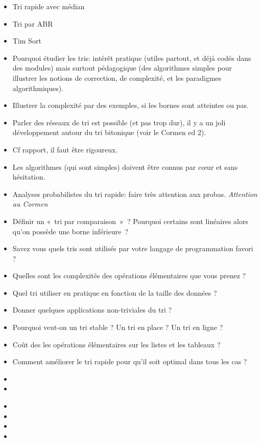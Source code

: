 \documentclass{agregfiche}
\begin{document}
\begin{itemize}
    \item Tri rapide avec médian
    \item Tri par ABR
    \item Tim Sort
    \item Pourquoi étudier les tris: intérêt pratique (utiles partout, et déjà codés dans des modules) mais surtout pédagogique (des algorithmes simples pour illustrer les notions de correction, de complexité, et les paradigmes algorithmiques).
    \item Illustrer la complexité par des exemples, si les bornes sont atteintes ou pas.
    \item Parler des réseaux de tri est possible (et pas trop dur), il y a un joli développement autour du tri bitonique (voir le Cormen ed 2).
\end{itemize}

\secpieges

\begin{itemize}
    \item Cf rapport, il faut être rigoureux.
    \item Les algorithmes (qui sont simples) doivent être connus par c\oe ur et sans hésitation.
    \item Analyses probabilistes du tri rapide: faire très attention aux probas.
        \emph{Attention au Cormen}
\end{itemize}


\secquestionsclassiques

\begin{itemize}
    \item Définir un «~tri par comparaison~»~? Pourquoi certains sont linéaires
        alors qu'on possède une borne inférieure~?
    \item Savez vous quels tris sont utilisés par votre langage de programmation
        favori ?
    \item Quelles sont les complexités des opérations élémentaires que vous
        prenez ?
    \item Quel tri utiliser en pratique en fonction de la taille des données ?
    \item Donner quelques applications non-triviales du tri ?
    \item Pourquoi veut-on un tri stable ? Un tri en place ? Un tri en ligne ?
    \item Coût des les opérations élémentaires sur les listes et les tableaux ?
    \item Comment améliorer le tri rapide pour qu'il soit optimal dans tous les cas ?
\end{itemize}

\secreferences

\begin{itemize}
    \item 
    \item 
\end{itemize}

\secdev

\begin{itemize}
	\item 
	\item 
	\item 
	\item 
\end{itemize}
\end{document}
